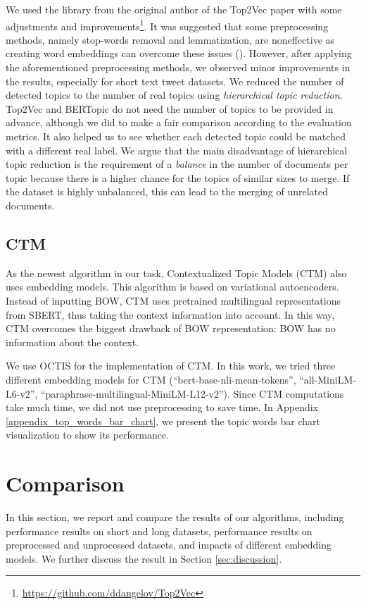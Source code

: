 \documentclass[11pt]{article}
\begin{document}
We used the library from the original author of the Top2Vec paper with some adjustments and improvements\footnote{\url{https://github.com/ddangelov/Top2Vec}}. It was suggested that some preprocessing methods, namely stop-words removal and lemmatization, are noneffective as creating word embeddings can overcome these issues (\citealp{top2vec}). However, after applying the aforementioned preprocessing methods, we observed minor improvements in the results, especially for short text tweet datasets. We reduced the number of detected topics to the number of real topics using \emph{hierarchical topic reduction}. Top2Vec and BERTopic do not need the number of topics to be provided in advance, although we did to make a fair comparison according to the evaluation metrics. It also helped us to see whether each detected topic could be matched with a different real label. We argue that the main disadvantage of hierarchical topic reduction is the requirement of a \emph{balance} in the number of documents per topic because there is a higher chance for the topics of similar sizes to merge. If the dataset is highly unbalanced, this can lead to the merging of unrelated documents.

\subsection{CTM}
As the newest algorithm in our task, Contextualized Topic Models (CTM) also uses embedding models. This algorithm is based on variational autoencoders. Instead of inputting BOW, CTM uses pretrained multilingual representations from SBERT, thus taking the context information into account. In this way, CTM overcomes the biggest drawback of BOW representation: BOW has no information about the context.

We use OCTIS for the implementation of CTM. In this work, we tried three different embedding models for CTM (“bert-base-nli-mean-tokens”, “all-MiniLM-L6-v2”, “paraphrase-multilingual-MiniLM-L12-v2”). Since CTM computations take much time, we did not use preprocessing to save time. In Appendix \ref{appendix_top_words_bar_chart}, we present the topic words bar chart visualization to show its performance.

\section{Comparison}
\label{sec:comparison}
In this section, we report and compare the results of our algorithms, including performance results on short and long datasets, performance results on preprocessed and unprocessed datasets, and impacts of different embedding models. We further discuss the result in Section \ref{sec:discussion}.
\end{document}

